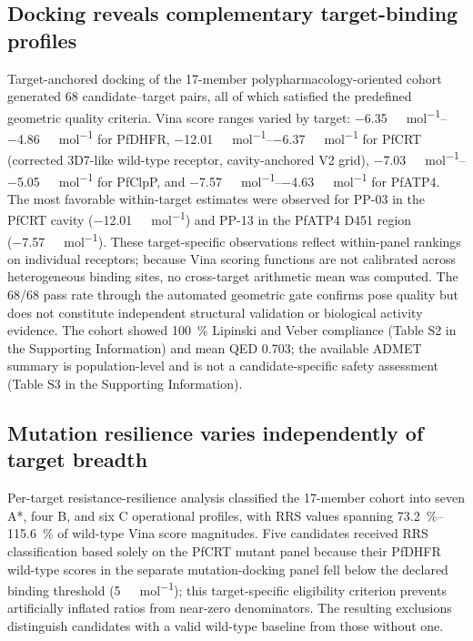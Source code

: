 \documentclass[11pt,a4paper]{article}
\begin{document}
	\subsection{Docking reveals complementary target-binding profiles}\label{sec:results_docking}
	Target-anchored docking of the 17-member polypharmacology-oriented cohort generated \num{68} candidate--target pairs, all of which satisfied the predefined geometric quality criteria. Vina score ranges varied by target: \qtyrange{-6.35}{-4.86}{\kilo\calorie\per\mol} for PfDHFR, \qtyrange{-12.01}{-6.37}{\kilo\calorie\per\mol} for PfCRT (corrected 3D7-like wild-type receptor, cavity-anchored V2 grid), \qtyrange{-7.03}{-5.05}{\kilo\calorie\per\mol} for PfClpP, and \qtyrange{-7.57}{-4.63}{\kilo\calorie\per\mol} for PfATP4. The most favorable within-target estimates were observed for PP-03 in the PfCRT cavity (\qty{-12.01}{\kilo\calorie\per\mol}) and PP-13 in the PfATP4 D451 region (\qty{-7.57}{\kilo\calorie\per\mol}). These target-specific observations reflect within-panel rankings on individual receptors; because Vina scoring functions are not calibrated across heterogeneous binding sites, no cross-target arithmetic mean was computed. The \num{68}/\num{68} pass rate through the automated geometric gate confirms pose quality but does not constitute independent structural validation or biological activity evidence. The cohort showed \qty{100}{\percent} Lipinski and Veber compliance (Table S2 in the Supporting Information) and mean QED \num{0.703}; the available ADMET summary is population-level and is not a candidate-specific safety assessment (Table S3 in the Supporting Information).
	
	\subsection{Mutation resilience varies independently of target breadth}\label{sec:results_mutation}
	Per-target resistance-resilience analysis classified the 17-member cohort into seven A*, four B, and six C operational profiles, with RRS values spanning \qtyrange{73.2}{115.6}{\percent} of wild-type Vina score magnitudes. Five candidates received RRS classification based solely on the PfCRT mutant panel because their PfDHFR wild-type scores in the separate mutation-docking panel fell below the declared binding threshold (\qty{5}{\kilo\calorie\per\mol}); this target-specific eligibility criterion prevents artificially inflated ratios from near-zero denominators. The resulting exclusions distinguish candidates with a valid wild-type baseline from those without one.
	
\end{document}
